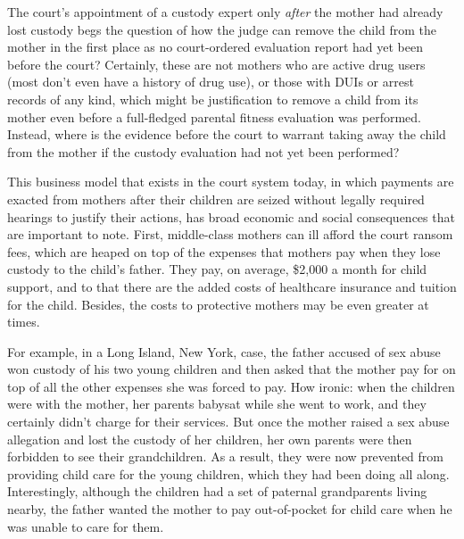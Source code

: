 The court's appointment of a custody expert only \textit{after} the mother
had already lost custody begs the question of how the judge can remove
the child from the mother in the first place as no court-ordered 
evaluation report had yet been before the court? Certainly, these are not
mothers who are active drug users (most don't even have a history
of drug use), or those with DUIs or arrest records of any kind, which
might be justification to remove a child from its mother even before a
full-fledged parental fitness evaluation was performed. Instead, where is
the evidence before the court to warrant taking away the child from the
mother if the custody evaluation had not yet been performed? \pfl{}


\vspace{3em}



\noindent{}This  business model that exists in the court system today, in
which payments are exacted from mothers after their children are
seized without legally required hearings to justify their actions, has
broad economic and social consequences that are important to note.
First, middle-class mothers can ill afford the court ransom fees, which
are heaped on top of the expenses that mothers pay when they lose 
custody to the child's father. They pay, on average, \$2,000 a month for child
support, and to that there are the added costs of healthcare insurance
and tuition for the child. Besides, the costs to protective mothers may
be even greater at times. \pfl{}

For example, in a Long Island, New York, case, the father accused of
sex abuse won custody of his two young children and then asked that
the mother pay for  on top of all the other expenses
she was forced to pay. How ironic: when the children were with the
mother, her parents babysat while she went to work, and they certainly
didn't charge for their services. But once the mother raised a sex abuse
allegation and lost the custody of her children, her own parents were
then forbidden to see their grandchildren. As a result, they were now
prevented from providing  child care for the young children,
which they had been doing all along. Interestingly, although the children
had a set of paternal grandparents living nearby, the father wanted the
mother to pay out-of-pocket for child care when he was unable to care for
them. \pfl{}

